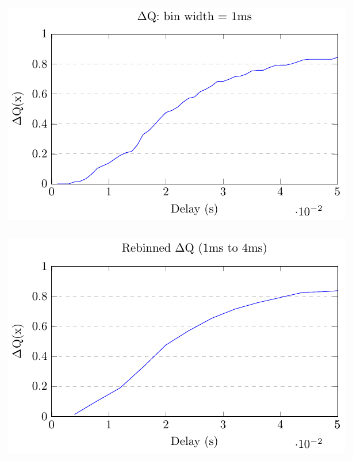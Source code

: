         \begin{figure}[H]
            \centering
            \begin{subfigure}{.5\textwidth}
                \centering
                \includegraphics[width =0.98\textwidth]{tikz/cdf.pdf}
                \label{fig:nrb}
            \end{subfigure}%
            \begin{subfigure}{.5\textwidth}%
                \centering%
                \includegraphics[width =0.98\textwidth]{tikz/rebinned_cdf.pdf}%
                \label{fig:sub2}%
            \end{subfigure}%
            \label{fig:w1w2hb}%
            \end{figure}%


